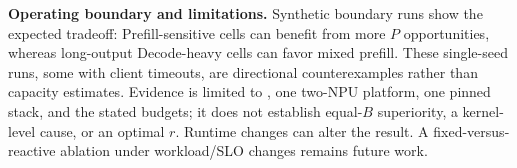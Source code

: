\textbf{Operating boundary and limitations.}
Synthetic boundary runs show the expected tradeoff: Prefill-sensitive cells
can benefit from more $P$ opportunities, whereas long-output Decode-heavy cells
can favor mixed prefill. These single-seed runs, some with client timeouts, are
directional counterexamples rather than capacity estimates. Evidence is limited
to \modelname{}, one two-NPU platform, one pinned stack, and the stated budgets;
it does not establish equal-$B$ superiority, a kernel-level cause, or an optimal
$r$. Runtime changes can alter the result. A fixed-versus-reactive ablation
under workload/SLO changes remains future work.
